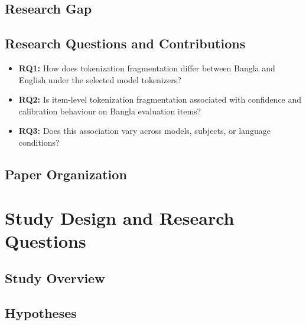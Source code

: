 \documentclass[runningheads]{llncs}
\begin{document}
\subsection{Research Gap}

\subsection{Research Questions and Contributions}
\begin{itemize}
	\item \textbf{RQ1:} How does tokenization fragmentation differ between Bangla and English under the selected model tokenizers?
	\item \textbf{RQ2:} Is item-level tokenization fragmentation associated with confidence and calibration behaviour on Bangla evaluation items?
	\item \textbf{RQ3:} Does this association vary across models, subjects, or language conditions?
\end{itemize}

\subsection{Paper Organization}

\section{Study Design and Research Questions}
\subsection{Study Overview}

\subsection{Hypotheses}
\end{document}

